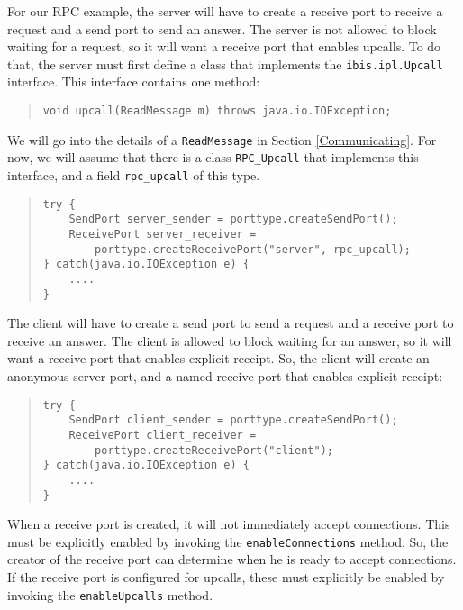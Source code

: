 \documentclass[10pt]{article}
\begin{document}
For our RPC example, the server will have to create a receive port
to receive a request and a send port to send an answer.
The server is not allowed to block waiting for a request, so it will
want a receive port that enables upcalls.
To do that, the server must first define a class that implements
the \verb+ibis.ipl.Upcall+ interface. This interface contains one
method:

\begin{quote}
\begin{verbatim}
void upcall(ReadMessage m) throws java.io.IOException;
\end{verbatim}
\end{quote}

We will go into the details of a \verb+ReadMessage+ in Section
\ref{Communicating}. For now, we will assume that there is a
class \verb+RPC_Upcall+ that implements this interface, and
a field \verb+rpc_upcall+ of this type.

\begin{quote}
\begin{verbatim}
try {
    SendPort server_sender = porttype.createSendPort();
    ReceivePort server_receiver =
        porttype.createReceivePort("server", rpc_upcall);
} catch(java.io.IOException e) {
    ....
}
\end{verbatim}
\end{quote}

The client will have to create a send port
to send a request and a receive port to receive an answer.
The client is allowed to block waiting for an answer, so it will
want a receive port that enables explicit receipt.
So, the client will create an anonymous server port, and a named
receive port that enables explicit receipt:

\begin{quote}
\begin{verbatim}
try {
    SendPort client_sender = porttype.createSendPort();
    ReceivePort client_receiver =
        porttype.createReceivePort("client");
} catch(java.io.IOException e) {
    ....
}
\end{verbatim}
\end{quote}

When a receive port is created, it will not immediately accept connections.
This must be explicitly enabled by
invoking the \verb+enableConnections+ method. So, the creator of
the receive port can determine when he is ready to accept connections.
If the receive port is configured for upcalls, these must
explicitly be enabled by invoking the \verb+enableUpcalls+ method.
\end{document}
